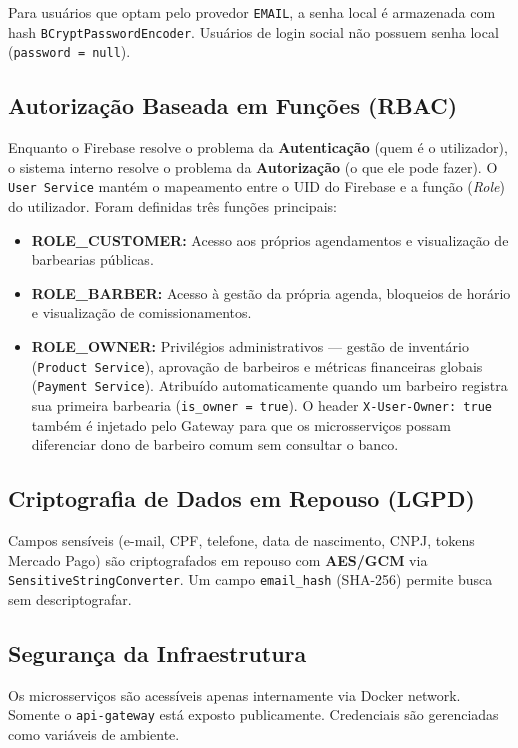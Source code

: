 \documentclass[
    12pt, 
    a4paper, 
    oneside, 
    chapter=TITLE, 
    section=TITLE
]{abntex2}
\begin{document}
Para usuários que optam pelo provedor \texttt{EMAIL}, a senha local é armazenada com hash \texttt{BCryptPasswordEncoder}. Usuários de login social não possuem senha local (\texttt{password = null}).

\subsection{Autorização Baseada em Funções (RBAC)}
Enquanto o Firebase resolve o problema da \textbf{Autenticação} (quem é o utilizador), o sistema interno resolve o problema da \textbf{Autorização} (o que ele pode fazer). O \texttt{User Service} mantém o mapeamento entre o UID do Firebase e a função (\textit{Role}) do utilizador. Foram definidas três funções principais:
\begin{itemize}
    \item \textbf{ROLE\_CUSTOMER:} Acesso aos próprios agendamentos e visualização de barbearias públicas.
    \item \textbf{ROLE\_BARBER:} Acesso à gestão da própria agenda, bloqueios de horário e visualização de comissionamentos.
    \item \textbf{ROLE\_OWNER:} Privilégios administrativos — gestão de inventário (\texttt{Product Service}), aprovação de barbeiros e métricas financeiras globais (\texttt{Payment Service}). Atribuído automaticamente quando um barbeiro registra sua primeira barbearia (\texttt{is\_owner = true}). O header \texttt{X-User-Owner: true} também é injetado pelo Gateway para que os microsserviços possam diferenciar dono de barbeiro comum sem consultar o banco.
\end{itemize}

\subsection{Criptografia de Dados em Repouso (LGPD)}
Campos sensíveis (e-mail, CPF, telefone, data de nascimento, CNPJ, tokens Mercado Pago) são criptografados em repouso com \textbf{AES/GCM} via \texttt{SensitiveStringConverter}. Um campo \texttt{email\_hash} (SHA-256) permite busca sem descriptografar.

\subsection{Segurança da Infraestrutura}
Os microsserviços são acessíveis apenas internamente via Docker network. Somente o \texttt{api-gateway} está exposto publicamente. Credenciais são gerenciadas como variáveis de ambiente.
\end{document}
